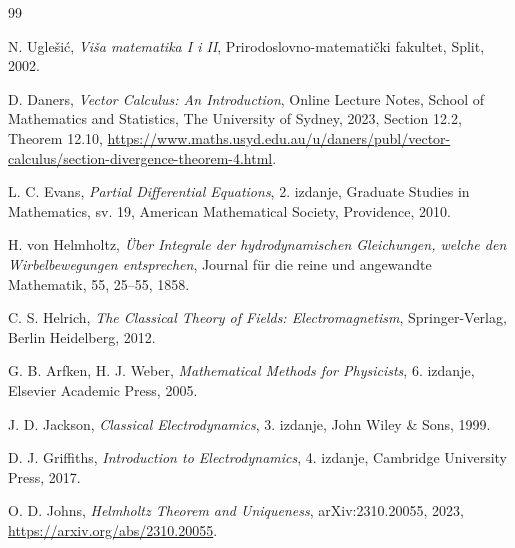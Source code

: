 \documentclass[12pt,a4paper]{article}
\begin{document}
\newpage
{}
{}
\begin{thebibliography}{99}

N. Uglešić,
\textit{Viša matematika I i II},
Prirodoslovno-matematički fakultet, Split, 2002.

D. Daners,
\textit{Vector Calculus: An Introduction},
Online Lecture Notes,
School of Mathematics and Statistics, The University of Sydney,
2023, Section 12.2, Theorem 12.10,
\url{https://www.maths.usyd.edu.au/u/daners/publ/vector-calculus/section-divergence-theorem-4.html}.

L. C. Evans,
\textit{Partial Differential Equations},
2. izdanje, Graduate Studies in Mathematics, sv. 19,
American Mathematical Society, Providence, 2010.

H. von Helmholtz,
\textit{Über Integrale der hydrodynamischen Gleichungen, welche den Wirbelbewegungen entsprechen},
Journal für die reine und angewandte Mathematik,
55, 25--55, 1858.

C. S. Helrich,
\textit{The Classical Theory of Fields: Electromagnetism},
Springer-Verlag, Berlin Heidelberg, 2012.

G. B. Arfken, H. J. Weber,
\textit{Mathematical Methods for Physicists},
6. izdanje, Elsevier Academic Press, 2005.

J. D. Jackson,
\textit{Classical Electrodynamics},
3. izdanje, John Wiley \& Sons, 1999.

D. J. Griffiths,
\textit{Introduction to Electrodynamics},
4. izdanje, Cambridge University Press, 2017.

O. D. Johns,
\textit{Helmholtz Theorem and Uniqueness},
arXiv:2310.20055, 2023,
\url{https://arxiv.org/abs/2310.20055}.

\end{thebibliography}

\newpage
{}
{}
\listoffigures
\end{document}
